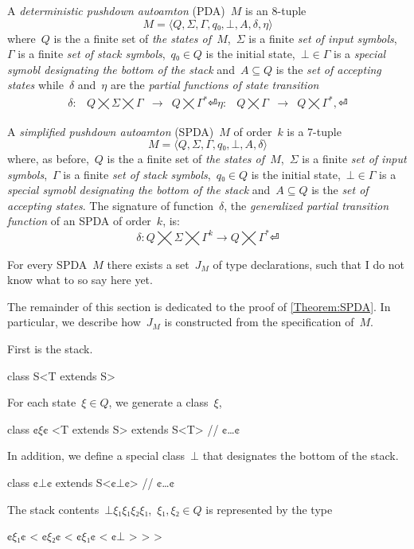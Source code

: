 \begin{Definition}
  A \emph{deterministic pushdown autoamton} (PDA)~$M$ is an 8-tuple
  \[
    M =⟨Q,Σ,Γ, q₀,⊥, A,δ,η⟩
  \]
  where~$Q$ is the a finite set of
  \emph{the states of~$M$},~$Σ$ is a finite
  \emph{set of input symbols},~$Γ$ is a finite
  \emph{set of stack symbols},~$q₀∈Q$ is the initial state,~$⊥∈Γ$
  is a \emph{special symobl designating the bottom of the stack}
  and~$A⊆Q$ is the \emph{set of accepting states} while~$δ$ and~$η$ are
  the \emph{partial functions of state transition}
  \[
    \begin{array}{crlc}
      δ: & Q⨉Σ⨉Γ & → & Q⨉Γ^*⏎
      η: & Q⨉Γ & → & Q⨉Γ^*,⏎
    \end{array}
  \]
\end{Definition}

\begin{Definition}
  A \emph{simplified pushdown autoamton} (SPDA)~$M$ of order~$k$ is a 7-tuple
  \[
    M =⟨Q,Σ,Γ,q₀,⊥, A,δ⟩
  \]
  where, as before,~$Q$ is the a finite set of
  \emph{the states of~$M$},~$Σ$ is a finite
  \emph{set of input symbols},~$Γ$ is a finite
  \emph{set of stack symbols},~$q₀∈Q$ is the initial state,~$⊥∈Γ$
  is a \emph{special symobl designating the bottom of the stack}
  and~$A⊆Q$ is the \emph{set of accepting states}.
  The signature of function~$δ$, the \emph{generalized partial transition function}
  of an SPDA of order~$k$, is:
  \[
      δ: Q⨉Σ⨉Γ^k → Q⨉Γ^*⏎
  \]
\end{Definition}

\begin{Theorem}
  \label{Theorem:SPDA}
  For every SPDA~$M$ there exists a set~$J_M$ of \Java type declarations, such that
    I do not know what to so say here yet.
\end{Theorem}

The remainder of this section is dedicated to the proof of \cref{Theorem:SPDA}.
In particular, we describe how~$J_M$ is constructed from the
  specification of~$M$.

First is the stack.
\begin{JAVA}
class S<T extends S> {
}
\end{JAVA}
For each state~$ξ∈Q$, we generate a \Java class~$ξ$,
\begin{JAVA}
class ¢$ξ$¢ <T extends S> extends S<T>{
  // ¢…¢
}
\end{JAVA}
In addition, we define a special class~$⊥$ that designates the bottom of the stack.
\begin{JAVA}
class ¢$⊥$¢ extends S<¢$⊥$¢> {
  // ¢…¢
}
\end{JAVA}
The stack contents~$⊥ξ₁ξ₁ξ₂ξ₁$,~$ξ₁,ξ₂∈Q$
is represented by the type
\begin{JAVA}
  ¢$ξ₁$¢ < ¢$ξ₂$¢ < ¢$ξ₁$¢ < ¢$⊥$ > > >
\end{JAVA}

